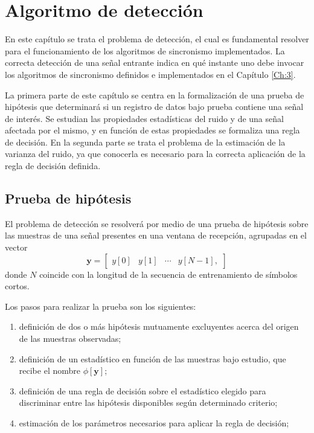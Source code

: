 \chapter{Algoritmo de detección}
\label{Ch:4}
\graphicspath{{figs/}}

En este capítulo se trata el problema de detección, el cual es fundamental resolver para el funcionamiento de los algoritmos de sincronismo implementados. La correcta detección de una señal entrante indica en qué instante uno debe invocar los algoritmos de sincronismo definidos e implementados en el Capítulo \ref{Ch:3}. 

La primera parte de este capítulo se centra en la formalización de una prueba de hipótesis que determinará si un registro de datos bajo prueba contiene una señal de interés. Se estudian las propiedades estadísticas del ruido y de una señal afectada por el mismo, y en función de estas propiedades se formaliza una regla de decisión. En la segunda parte se trata el problema de la estimación de la varianza del ruido, ya que conocerla es necesario para la correcta aplicación de la regla de decisión definida.

\section{Prueba de hipótesis}
\label{S:prueba-hipotesis}

El problema de detección se resolverá por medio de una prueba de hipótesis sobre las muestras de una señal presentes en una ventana de recepción, agrupadas en el vector
\begin{equation}\label{eq:def_y}
    \mathbf{y} = \begin{bmatrix}
        y[0] & y[1] & \cdots & y[N-1],
    \end{bmatrix}
\end{equation}
donde $N$ coincide con la longitud de la secuencia de entrenamiento de símbolos cortos. 

Los pasos para realizar la prueba son los siguientes:
\begin{enumerate}
    \item definición de dos o más hipótesis mutuamente excluyentes acerca del origen de las muestras observadas;
    \item definición de un estadístico en función de las muestras bajo estudio, que recibe el nombre $\phi\left[\mathbf{y}\right]$;
    \item definición de una regla de decisión sobre el estadístico elegido para discriminar entre las hipótesis disponibles según determinado criterio;
    \item estimación de los parámetros necesarios para aplicar la regla de decisión;
\end{enumerate}

